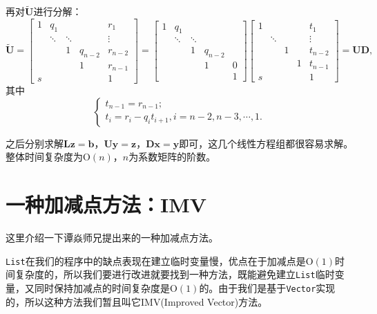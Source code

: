 \documentclass[a4paper,twoside]{ctexart}
\begin{document}
再对$\tilde{\bm{U}}$进行分解：
\begin{equation}
  \tilde{\bm{U}}=\begin{bmatrix}
    1&q_1   &      &       &r_1\\
     &\ddots&\ddots&       &\vdots\\
     &      &1     &q_{n-2}&r_{n-2}\\
     &      &      &1      &r_{n-1}\\
    s&      &      &       &1
  \end{bmatrix}=
  \begin{bmatrix}
    1&q_1&&&\\
     &\ddots&\ddots&&\\
     &      &1     &q_{n-2}&\\
     &      &      &1      &0\\
     &      &      &       &1
  \end{bmatrix}
  \begin{bmatrix}
    1&      & & &t_1\\
     &\ddots& & &\vdots\\
     &      &1& &t_{n-2}\\
     &      & &1&t_{n-1}\\
    s&      & & &1
  \end{bmatrix}=\bm{U}\bm{D},
\end{equation}
其中
\begin{equation}
  \left\{
    \begin{array}{l}
      t_{n-1}=r_{n-1};\\
      t_i=r_i-q_i t_{i+1},i=n-2,n-3,\cdots,1.
    \end{array}
  \right.
\end{equation}

之后分别求解$\bm{L}\bm{z}=\bm{b}$，$\bm{U}\bm{y}=\bm{z}$，$\bm{D}\bm{x}=\bm{y}$即可，这几个线性方程组都很容易求解。整体时间复杂度为$\mathrm{O}(n)$，$n$为系数矩阵的阶数。

\section{一种加减点方法：IMV}
这里介绍一下谭焱师兄提出来的一种加减点方法。

\texttt{List}在我们的程序中的缺点表现在建立临时变量慢，优点在于加减点是$\mathrm{O}(1)$时间复杂度的，所以我们要进行改进就要找到一种方法，既能避免建立\texttt{List}临时变量，又同时保持加减点的时间复杂度是$\mathrm{O}(1)$的。由于我们是基于\texttt{Vector}实现的，所以这种方法我们暂且叫它IMV(Improved Vector)方法。
\vspace{-1em}
\end{document}
